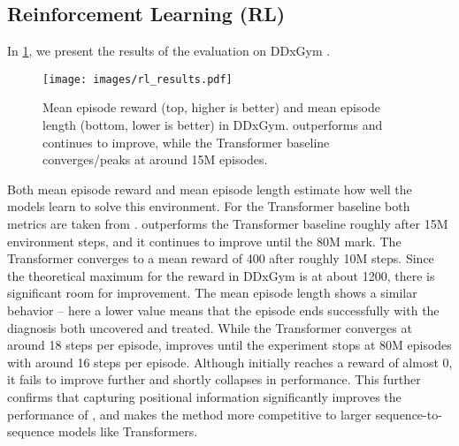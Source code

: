 \subsection{Reinforcement Learning (RL)}
In \cref{fig:rl_results}, we present the results of the evaluation on DDxGym \cite{ddxgym}.
\begin{figure}[tb]
    \centering\texttt{[image: images/rl\_results.pdf]}
    \caption{Mean episode reward (top, higher is better) and mean episode length (bottom, lower is better) in DDxGym. \methodname outperforms and continues to improve, while the Transformer baseline converges/peaks at around 15M episodes.}
    \label{fig:rl_results}
\end{figure}
Both mean episode reward and mean episode length estimate how well the models learn to solve this environment.
For the Transformer baseline both metrics are taken from \cite{ddxgym}.
\methodname outperforms the Transformer baseline roughly after 15M environment steps, and it continues to improve until the 80M mark.
The Transformer converges to a mean reward of 400 after roughly 10M steps.
Since the theoretical maximum for the reward in DDxGym is at about 1200, there is significant room for improvement.
The mean episode length shows a similar behavior -- here a lower value means that the episode ends successfully with the diagnosis both uncovered and treated. 
While the Transformer converges at around 18 steps per episode, \methodname improves until the experiment stops at 80M episodes with around 16 steps per episode.
Although \pflyvec initially reaches a reward of almost 0, it fails to improve further and shortly collapses in performance.
This further confirms that capturing positional information significantly improves the performance of \methodname, and makes the method more competitive to larger sequence-to-sequence models like Transformers.
